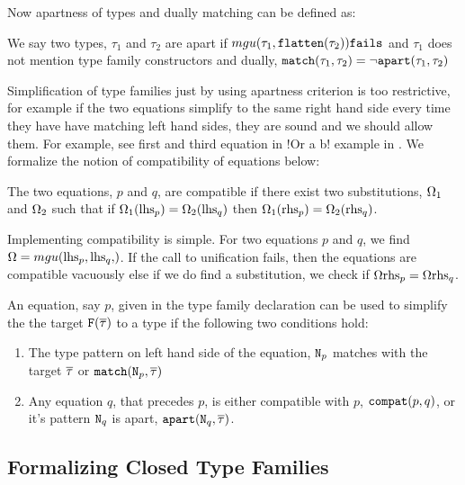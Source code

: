 \documentclass[format=sigplan,manuscript,review,screen,nonacm,margin=1in]{acmart}
\begin{document}
Now apartness of types and dually matching can be defined as:
\begin{definition}\label{def:apart-match-ty}
  We say two types, $\tau_1$ and $\tau_2$ are apart if $mgu(\tau_1,\texttt{flatten}(\tau_2))\texttt{fails}$ and $\tau_1$ does not
  mention type family constructors and dually, $\texttt{match}(\tau_1, \tau_2) = \lnot\texttt{apart}(\tau_1, \tau_2)$
\end{definition}
Simplification of type families just by using apartness criterion is too restrictive,
for example if the two equations simplify to the
same right hand side every time they have have matching left hand sides,
they are sound and we should allow them. For example, see first and third equation in
!Or a b! example in .
We formalize the notion of compatibility of equations below:
\begin{definition}\label{def:compact-eq}
  The two equations, $p$ and $q$, are compatible
  if there exist two substitutions, $\Omega_1$ and $\Omega_2$ such that
  if $\Omega_1(\text{lhs}_{p}) = \Omega_2(\text{lhs}_{q})$ then $\Omega_1(\text{rhs}_{p}) = \Omega_2(\text{rhs}_{q})$.
\end{definition}
Implementing compatibility is simple. For two equations $p$ and $q$, we find $\Subst = \mgu{\lhs p, \lhs q}$.
If the call to unification fails, then the equations are compatible vacuously else if we do find a substitution,
we check if $\Omega\text{rhs}_{p} = \Omega\text{rhs}_{q}$. 
\begin{definition}\label{def:cft-simpl}
  An equation, say $p$, given in the type family declaration can be used to simplify the the
  target $\texttt{F}(\overline{\tau})$ to a type if the following two conditions hold:
  \begin{enumerate}
  \item The type pattern on left hand side of the equation, $\texttt{N}_p$ matches with the
    target $\overline{\tau}$ or $\texttt{match}(\texttt{N}_p, \overline{\tau})$
  \item Any equation $q$, that precedes $p$, is either compatible with $p$, $\texttt{compat}(p, q)$,
    or it's pattern $\texttt{N}_q$ is apart, $\texttt{apart}(\texttt{N}_q, \overline{\tau})$.
  \end{enumerate}
\end{definition}

\subsection{Formalizing Closed Type Families}\label{subsec:tf-closed-formal}
\end{document}
